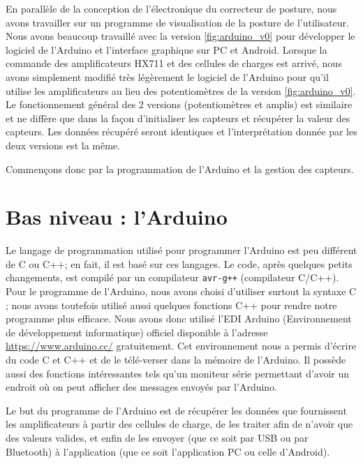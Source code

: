 \documentclass{polytech/polytech}
\begin{document}
En parallèle de la conception de l'électronique du correcteur de posture, nous avons travailler sur un programme de visualisation de la posture de l'utilisateur. Nous avons beaucoup travaillé avec la version \ref{fig:arduino_v0} pour développer le logiciel de l'Arduino et l'interface graphique sur PC et Android. Lorsque la commande des amplificateurs HX711 et des cellules de charges est arrivé, nous avons simplement modifié très légèrement le logiciel de l'Arduino pour qu'il utilise les amplificateurs au lieu des potentiomètres de la version \ref{fig:arduino_v0}. Le fonctionnement général des 2 versions (potentiomètres et amplis) est similaire et ne diffère que dans la façon d'initialiser les capteurs et récupérer la valeur des capteurs. Les données récupéré seront identiques et l'interprétation donnée par les deux versions est la même.

Commençons donc par la programmation de l'Arduino et la gestion des capteurs.


\section{Bas niveau : l'Arduino}
\label{sec:logiciel_bas}

Le langage de programmation utilisé pour programmer l'Arduino est peu différent de C ou C++; en fait, il est basé sur ces langages. Le code, après quelques petits changements, est compilé par un compilateur \texttt{avr-g++} (compilateur C/C++). Pour le programme de l'Arduino, nous avons choisi d'utiliser surtout la syntaxe C ; nous avons toutefois utilisé aussi quelques fonctions C++ pour rendre notre programme plus efficace. Nous avons donc utilisé l'EDI Arduino (Environnement de développement informatique) officiel disponible à l'adresse \url{https://www.arduino.cc/} gratuitement. Cet environnement nous a permis d'écrire du code C et C++ et de le télé-verser dans la mémoire de l'Arduino. Il possède aussi des fonctions intéressantes tels qu'un moniteur série permettant d'avoir un endroit où on peut afficher des messages envoyés par l'Arduino.

Le but du programme de l'Arduino est de récupérer les données que fournissent les amplificateurs à partir des cellules de charge, de les traiter afin de n'avoir que des valeurs valides, et enfin de les envoyer (que ce soit par USB ou par Bluetooth) à l'application (que ce soit l'application PC ou celle d'Android).
\end{document}
